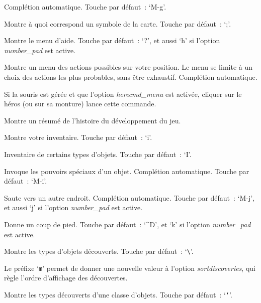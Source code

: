 \documentclass[titlepage]{article}
\begin{document}
\begin{description}
Complétion automatique.
Touche par défaut~: `M-g'.

\item[{\#glance}]
Montre à quoi correspond un symbole de la carte.
Touche par défaut~: `;'.

\item[{\#help}]
Montre le menu d'aide.
Touche par défaut~: `?', et aussi `h' si l'option
\textit{number\_pad}
est active.

\item[{\#herecmdmenu}]
Montre un menu des actions possibles sur votre position.
Le menu se limite à un choix des actions les plus probables, sans être
exhaustif.
Complétion automatique.


Si la souris est gérée et que l'option
\textit{herecmd\_menu}
est activée, cliquer sur le héros (ou sur sa monture) lance cette
commande.

\item[{\#history}]
Montre un résumé de l'histoire du développement du jeu.

\item[{\#inventory}]
Montre votre inventaire.
Touche par défaut~: `i'.

\item[{\#inventtype}]
Inventaire de certains types d'objets.
Touche par défaut~: `I'.

\item[{\#invoke}]
Invoque les pouvoirs spéciaux d'un objet.
Complétion automatique.
Touche par défaut~: `M-i'.

\item[{\#jump}]
Saute vers un autre endroit.
Complétion automatique.
Touche par défaut~: `M-j', et aussi `j' si l'option
\textit{number\_pad}
est active.

\item[{\#kick}]
Donne un coup de pied.
Touche par défaut~: `\textasciicircum{}D', et `k' si l'option
\textit{number\_pad}
est active.

\item[{\#known}]
Montre les types d'objets découverts.
Touche par défaut~: `\texttt{\textbackslash{}}'.


Le préfixe `\texttt{m}' permet de donner une nouvelle valeur à l'option
\textit{sortdiscoveries},
qui règle l'ordre d'affichage des découvertes.

\item[{\#knownclass}]
Montre les types découverts d'une classe d'objets.
Touche par défaut~: `\texttt{`}'.



\end{description}
\end{document}
